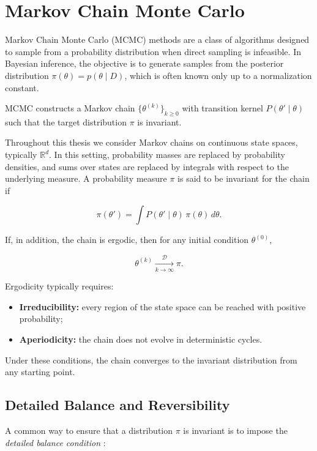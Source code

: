 \documentclass[11pt, twoside]{report}
\begin{document}
\section{Markov Chain Monte Carlo}

Markov Chain Monte Carlo (MCMC) methods are a class of algorithms designed to sample 
from a probability distribution when direct sampling is infeasible. In Bayesian inference, 
the objective is to generate samples from the posterior distribution 
$\pi(\theta) = p(\theta \mid D)$, which is often known only up to a normalization constant.

MCMC constructs a Markov chain $\{\theta^{(k)}\}_{k \ge 0}$ with transition kernel 
$P(\theta' \mid \theta)$ such that the target distribution $\pi$ is invariant. 

Throughout this thesis we consider Markov chains on continuous state spaces, typically $\mathbb{R}^d$. In this setting, probability masses are replaced by probability
densities, and sums over states are replaced by integrals with respect to
the underlying measure.
A probability measure $\pi$ is said to be invariant for the chain if

\begin{equation} \label{eq:invariance_ker}
    \pi(\theta') 
= \int P(\theta' \mid \theta)\,\pi(\theta)\,d\theta.
\end{equation}

If, in addition, the chain is ergodic, then for any initial condition $\theta^{(0)}$,

\[
\theta^{(k)} \xrightarrow[k\to\infty]{\mathcal{D}} \pi.
\]

Ergodicity typically requires:
\begin{itemize}
    \item \textbf{Irreducibility:} every region of the state space can be reached with positive probability;
    \item \textbf{Aperiodicity:} the chain does not evolve in deterministic cycles.
\end{itemize}

Under these conditions, the chain converges to the invariant distribution from any starting point\cite{robert2004monte,meyn2012-oq}. 

\subsection{Detailed Balance and Reversibility}

A common way to ensure that a distribution $\pi$ is invariant is to impose the 
\emph{detailed balance condition} \cite{pavliotis_book}:
\end{document}
